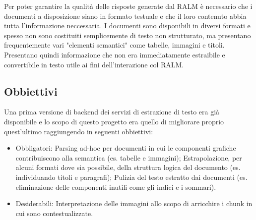 Per poter garantire la qualità delle risposte generate dal RALM è necessario che i documenti a disposizione siano in formato testuale e che il loro contenuto abbia tutta l'informazione 
neccessaria.
I documenti sono disponibili in diversi formati e spesso non sono costituiti semplicemente di testo non strutturato, ma presentano frequentemente vari
"elementi semantici" come tabelle, immagini e titoli.
Presentano quindi informazione che non era immediatamente estraibile e convertibile in testo utile ai fini dell'interazione col RALM.

\subsection{Obbiettivi}
Una prima versione di backend dei servizi di estrazione di testo era già disponibile e lo scopo di questo progetto era quello di migliorare proprio quest'ultimo raggiungendo in seguenti obbiettivi:

\begin{itemize}
    \item Obbligatori:
    \subitem Parsing ad-hoc per documenti in cui le componenti grafiche contribuiscono alla semantica (es. tabelle e immagini);
    \subitem Estrapolazione, per alcuni formati dove sia possibile, della struttura logica del documento (es. individuando titoli e paragrafi);
    \subitem Pulizia del testo estratto dai documenti (es. eliminazione delle componenti inutili come gli indici e i sommari).
    \item Desiderabili:
    \subitem Interpretazione delle immagini allo scopo di arricchire i chunk in cui sono contestualizzate. 
\end{itemize}


